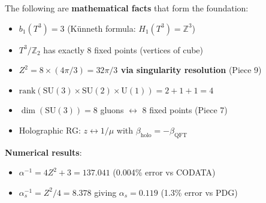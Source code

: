 \documentclass[12pt,a4paper]{article}
\newcommand{\Zsq}{Z^2}
\begin{document}
\begin{tcolorbox}[colback=green!10!white, colframe=green!60!black, title=What Is Established (v8.5.0)]
The following are \textbf{mathematical facts} that form the foundation:
\begin{itemize}[itemsep=0pt]
    \item[\checkmark] $b_1(T^3) = 3$ (K\"unneth formula: $H_1(T^3) = \mathbb{Z}^3$)
    \item[\checkmark] $T^3/\mathbb{Z}_2$ has exactly 8 fixed points (vertices of cube)
    \item[\checkmark] \textbf{$\Zsq = 8 \times (4\pi/3) = 32\pi/3$ via singularity resolution} (Piece 9)
    \item[\checkmark] $\text{rank}(\text{SU}(3) \times \text{SU}(2) \times \text{U}(1)) = 2 + 1 + 1 = 4$
    \item[\checkmark] $\dim(\text{SU}(3)) = 8$ gluons $\leftrightarrow$ 8 fixed points (Piece 7)
    \item[\checkmark] Holographic RG: $z \leftrightarrow 1/\mu$ with $\beta_{\text{holo}} = -\beta_{\text{QFT}}$
\end{itemize}
\textbf{Numerical results}:
\begin{itemize}[itemsep=0pt]
    \item $\alpha^{-1} = 4\Zsq + 3 = 137.041$ (0.004\% error vs CODATA)
    \item $\alpha_s^{-1} = \Zsq/4 = 8.378$ giving $\alpha_s = 0.119$ (1.3\% error vs PDG)
\end{itemize}
\end{tcolorbox}
\end{document}
